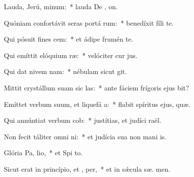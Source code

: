 \item Lauda, Jerú, minum:~* lauda De , on.
\item Quóniam confortávit seras portá rum:~* benedíxit fíli   te.
\item Qui pósuit fines  cem:~* et ádipe frumén  te.
\item Qui emíttit elóquium  ræ:~* velóciter cur  jus.
\item Qui dat nivem  nam:~* nébulam sicut  git.
\item Mittit crystállum suam sic las:~* ante fáciem frígoris ejus  bit?
\item Emíttet verbum suum, et liquefá a:~* flabit spíritus ejus,   quæ.
\item Qui annúntiat verbum  cob:~* justítias, et judíci  raël.
\item Non fecit táliter omni ni:~* et judícia sua non mani is.
\item Glória Pa,  lio,~* et Spi to.
\item Sicut erat in princípio, et ,  per,~* et in sǽcula sæ. men.
